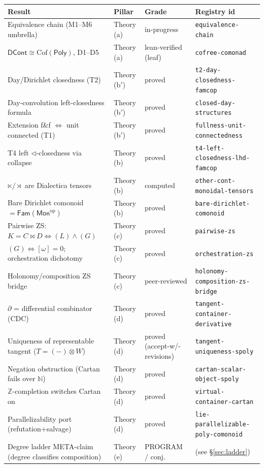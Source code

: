 \documentclass[11pt]{article}
\newcommand{\DCont}{\mathsf{DCont}}
\newcommand{\Poly}{\mathsf{Poly}}
\newcommand{\Fam}{\mathsf{Fam}}
\newcommand{\reg}[1]{\texttt{#1}}
\begin{document}
\begingroup
\small
\begin{longtable}{p{6.6cm} p{2.0cm} p{2.4cm} p{3.6cm}}
\textbf{Result} & \textbf{Pillar} & \textbf{Grade} & \textbf{Registry id} \\
\hline
\endhead
Equivalence chain (M1--M6 umbrella) & Theory (a) & in-progress & \reg{equivalence-chain} \\
$\DCont\cong\mathrm{Cof}(\Poly)$, D1--D5 & Theory (a) & lean-verified (leaf) & \reg{cofree-comonad} \\
Day/Dirichlet closedness (T2) & Theory (b$'$) & proved & \reg{t2-day-closedness-famcop} \\
Day-convolution left-closedness formula & Theory (b$'$) & proved & \reg{closed-day-structures} \\
Extension f\&f $\Leftrightarrow$ unit connected (T1) & Theory (b$'$) & proved & \reg{fullness-unit-connectedness} \\
T4 left $\lhd$-closedness via collapse & Theory (b) & proved & \reg{t4-left-closedness-lhd-famcop} \\
$\ltimes/\rtimes$ are Dialectica tensors & Theory (b) & computed & \reg{other-cont-monoidal-tensors} \\
Bare Dirichlet comonoid $=\Fam(\mathsf{Mon}^{\mathrm{op}})$ & Theory (b) & proved & \reg{bare-dirichlet-comonoid} \\
Pairwise ZS: $K=C\bowtie D\Leftrightarrow(L)\wedge(G)$ & Theory (c) & proved & \reg{pairwise-zs} \\
$(G)\Leftrightarrow[\omega]=0$; orchestration dichotomy & Theory (c) & proved & \reg{orchestration-zs} \\
Holonomy/composition ZS bridge & Theory (c) & peer-reviewed & \reg{holonomy-composition-zs-bridge} \\
$\partial$ = differential combinator (CDC) & Theory (d) & proved & \reg{tangent-container-derivative} \\
Uniqueness of representable tangent ($T=(-)\otimes W$) & Theory (d) & proved (accept-w/-revisions) & \reg{tangent-uniqueness-spoly} \\
Negation obstruction (Cartan fails over $\mathbb{N}$) & Theory (d) & proved & \reg{cartan-scalar-object-spoly} \\
$\mathbb{Z}$-completion switches Cartan on & Theory (d) & proved & \reg{virtual-container-cartan} \\
Parallelizability port (refutation+salvage) & Theory (d) & proved & \reg{lie-parallelizable-poly-comonoid} \\
Degree ladder META-claim (degree classifies composition) & Theory (e) & PROGRAM / conj. & (see \S\ref{sec:ladder}) \\

\end{longtable}
\end{document}

